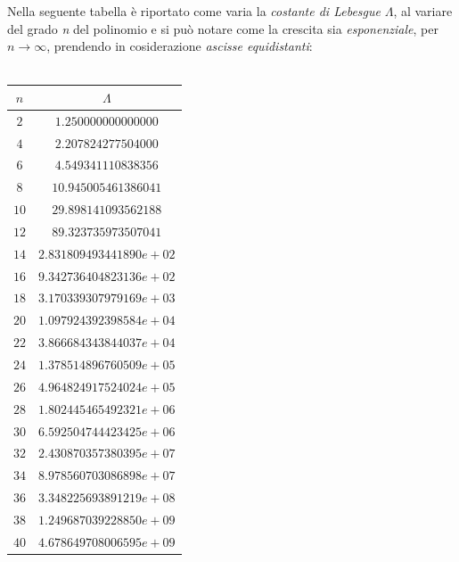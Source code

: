	\begin{figure}
			\quad
	\end{figure}
\newpage
Nella seguente tabella è riportato come varia la \textit{costante di Lebesgue} $\Lambda$, al variare del grado \textit{n} del polinomio e si può notare come la crescita sia \textit{esponenziale}, per $n\rightarrow\infty$, prendendo in cosiderazione \textit{ascisse equidistanti}:\\\
\begin{center}
	\begin{tabular}{|c|c|}
		\hline
		$n$ & $\Lambda$ \\
		\hline
		$2$  & $1.250000000000000$ \\ 
		$4$  & $2.207824277504000$ \\ 
		$6$  & $4.549341110838356$ \\ 
		$8$  & $10.945005461386041$ \\ 
		$10$ & $29.898141093562188$ \\ 
		$12$ & $89.323735973507041$ \\ 
		$14$ & $2.831809493441890e+02$ \\ 
		$16$ & $9.342736404823136e+02$ \\ 
		$18$ & $3.170339307979169e+03$ \\ 
		$20$ & $1.097924392398584e+04$ \\ 
		$22$ & $3.866684343844037e+04$ \\ 
		$24$ & $1.378514896760509e+05$ \\ 
		$26$ & $4.964824917524024e+05$ \\ 
		$28$ & $1.802445465492321e+06$ \\ 
		$30$ & $6.592504744423425e+06$ \\ 
		$32$ & $2.430870357380395e+07$ \\ 
		$34$ & $8.978560703086898e+07$ \\ 
		$36$ & $3.348225693891219e+08$ \\ 
		$38$ & $1.249687039228850e+09$ \\ 
		$40$ & $4.678649708006595e+09$ \\ 
		\hline
	\end{tabular}
\end{center}
